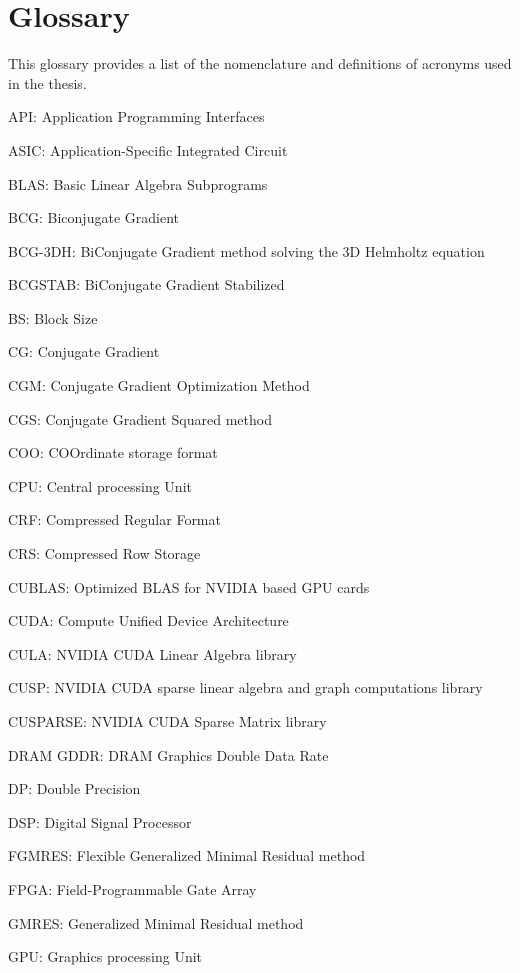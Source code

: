 

\chapter*{Glossary}
\label{Chapter:Glossary}
This glossary provides a list of the nomenclature and definitions of acronyms used in the thesis.


API: Application Programming Interfaces

ASIC: Application-Specific Integrated Circuit

BLAS: Basic Linear Algebra Subprograms

BCG: Biconjugate Gradient

BCG-3DH: BiConjugate Gradient method solving the 3D Helmholtz equation

BCGSTAB: BiConjugate Gradient Stabilized

BS: Block Size

CG: Conjugate Gradient

CGM: Conjugate Gradient Optimization Method

CGS: Conjugate Gradient Squared method

COO: COOrdinate storage format

CPU: Central processing Unit

CRF: Compressed Regular Format

CRS: Compressed Row Storage

CUBLAS: Optimized BLAS for NVIDIA based GPU cards

CUDA:  Compute Unified Device Architecture

CULA: NVIDIA CUDA Linear Algebra library

CUSP: NVIDIA CUDA sparse linear algebra and graph computations library

CUSPARSE: NVIDIA CUDA Sparse Matrix library

DRAM GDDR: DRAM Graphics Double Data Rate

DP: Double Precision

DSP: Digital Signal Processor

FGMRES: Flexible Generalized Minimal Residual method

FPGA: Field-Programmable Gate Array

GMRES: Generalized Minimal Residual method

GPU: Graphics processing Unit

